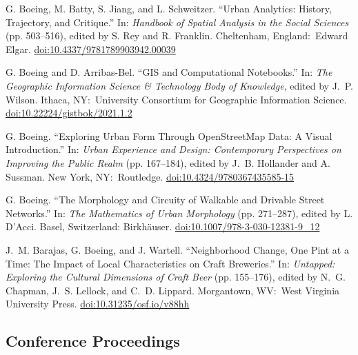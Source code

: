 \documentclass[11pt,letterpaper]{report} %
\begin{document}
\begin{tablist}

\item[2022] \tab{}G. Boeing, M. Batty, S. Jiang, and L. Schweitzer. \enquote{Urban Analytics: History, Trajectory, and Critique.} In: \textit{Handbook of Spatial Analysis in the Social Sciences} (pp. 503--516), edited by S. Rey and R. Franklin. Cheltenham, England:\ Edward Elgar. \href{https://doi.org/10.4337/9781789903942.00039}{doi:10.4337/9781789903942.00039}

\item[2021] \tab{}G. Boeing and D. Arribas-Bel. \enquote{GIS and Computational Notebooks.} In: \textit{The Geographic Information Science \& Technology Body of Knowledge}, edited by J.~P. Wilson. Ithaca, NY:\ University Consortium for Geographic Information Science. \href{https://doi.org/10.22224/gistbok/2021.1.2}{doi:10.22224/gistbok/2021.1.2}

\item[2021] \tab{}G. Boeing. \enquote{Exploring Urban Form Through OpenStreetMap Data: A Visual Introduction.} In: \textit{Urban Experience and Design: Contemporary Perspectives on Improving the Public Realm} (pp. 167--184), edited by J.~B. Hollander and A. Sussman. New York, NY:\ Routledge. \href{https://doi.org/10.4324/9780367435585-15}{doi:10.4324/9780367435585-15}

\item[2019] \tab{}G. Boeing. \enquote{The Morphology and Circuity of Walkable and Drivable Street Networks.} In: \textit{The Mathematics of Urban Morphology} (pp. 271--287), edited by L. D'Acci. Basel, Switzerland: Birkh{\"a}user. \href{https://doi.org/10.1007/978-3-030-12381-9_12}{doi:10.1007/978-3-030-12381-9\_12}

\item[2017] \tab{}J.~M. Barajas, G. Boeing, and J. Wartell. \enquote{Neighborhood Change, One Pint at a Time: The Impact of Local Characteristics on Craft Breweries.} In: \textit{Untapped: Exploring the Cultural Dimensions of Craft Beer} (pp. 155--176), edited by N.~G. Chapman, J.~S. Lellock, and C.~D. Lippard. Morgantown, WV:\ West Virginia University Press. \href{https://doi.org/10.31235/osf.io/v88hh}{doi:10.31235/osf.io/v88hh}

\end{tablist}

\subsection*{Conference Proceedings}
\end{document}
